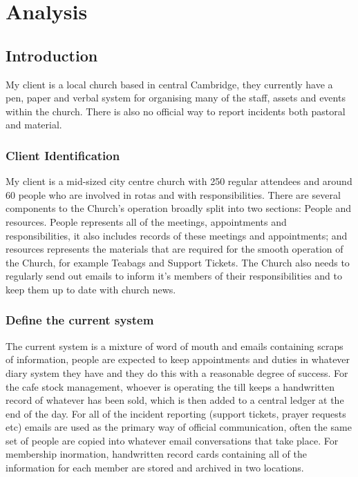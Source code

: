 \chapter{Analysis}

\section{Introduction}
	My client is a local church based in central Cambridge, they currently have a pen, paper and verbal system for organising many of the staff, assets and events within the church. There is also no official way to report incidents both pastoral and material.

\subsection{Client Identification}
	My client is a mid-sized city centre church with 250 regular attendees and around 60 people who are involved in rotas and with responsibilities. There are several components to the Church's operation broadly split into two sections: People and resources. People represents all of the meetings, appointments and responsibilities, it also includes records of these meetings and appointments; and resources represents the materials that are required for the smooth operation of the Church, for example Teabags and Support Tickets. The Church also needs to regularly send out emails to inform it's members of their responsibilities and to keep them up to date with church news.

\subsection{Define the current system}
	The current system is a mixture of word of mouth and emails containing scraps of information, people are expected to keep appointments and duties in whatever diary system they have and they do this with a reasonable degree of success. For the cafe stock management, whoever is operating the till keeps a handwritten record of whatever has been sold, which is then added to a central ledger at the end of the day. For all of the incident reporting (support tickets, prayer requests etc) emails are used as the primary way of official communication, often the same set of people are copied into whatever email conversations that take place. For membership inormation, handwritten record cards containing all of the information for each member are stored and archived in two locations.

